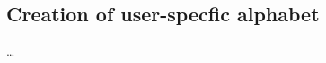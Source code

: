 \subsection{Creation of user-specfic alphabet}
\renewcommand{\codefile}{./recipes/AlphabetCreation.java}
\setcounter{off}{16}

\ldots